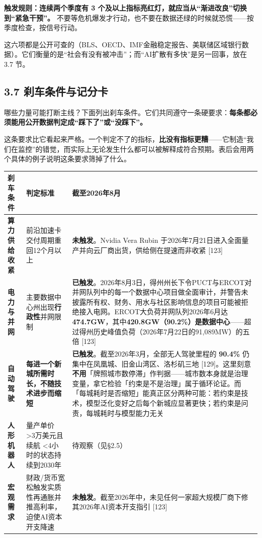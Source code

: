 \documentclass[11pt,a4paper]{ctexart}
\begin{document}
\textbf{触发规则：连续两个季度有 3 个及以上指标亮红灯，就应当从“渐进改良”切换到“紧急干预”。} 不要等危机爆发才行动，也不要在数据还绿的时候就恐慌——按季度检查，按信号行动。

这六项都是公开可查的（BLS、OECD、IMF金融稳定报告、美联储区域银行数据）。它们衡量的是“社会有没有被冲击”；而“AI扩散有多快”是另一回事，放在 3.7 节。

\subsection{3.7 刹车条件与记分卡}

哪些力量可能打断主线？下面列出刹车条件。它们共同遵守一条硬要求：\textbf{每条都必须能用公开数据判定成“踩下了”或“没踩下”。}

这条要求比它看起来严格。一个判定不了的指标，\textbf{比没有指标更糟}——它制造“我们在监控”的错觉，而实际上无论发生什么都可以被解释成符合预期。表后会用两个具体的例子说明这条要求筛掉了什么。

\begin{center}

\begin{tabularx}{\textwidth}{lXX}
\toprule
刹车条件 & 判定标准 & 截至2026年8月 \\
\midrule
\textbf{算力供给收紧} & 前沿加速卡交付周期重回12个月以上 & \textbf{未触发}。Nvidia Vera Rubin 于2026年7月21日进入全面量产并向云厂商出货，供给侧在提速而非收紧 [123] \\
\textbf{电力与并网} & 主要数据中心州出现\textbf{行政性}并网限制 & \textbf{已触发}。2026年8月3日，得州州长下令PUCT与ERCOT对并网队列中的每一个数据中心项目做全面审计，并警告未披露所有权、财务、用水与社区影响信息的项目可能被拒绝接入电网。ERCOT大负荷并网队列2026年6月达\textbf{474.7GW}，其中\textbf{420.8GW（90.2\%）是数据中心}——超过得州历史峰值负荷（2026年7月22日的91,089MW）的五倍 [123] \\
\textbf{自动驾驶} & \textbf{每进一个新城所需时长，不随技术进步而缩短} & \textbf{已触发}。截至2026年3月，全部无人驾驶里程的 \textbf{90.4\%} 仍集中在凤凰城、旧金山湾区、洛杉矶三地 [129]。这里刻意\textbf{不用}「牌照城市数停滞」作判据——城市数本身就是治理变量，拿它检验「约束是不是治理」属于循环论证。而「每城耗时是否缩短」能真正区分两种可能：若约束是技术，模型泛化变好之后每个新城应显著更快；若约束是问责，每城耗时与模型能力无关 \\
\textbf{人形机器人} & 量产单价 >3万美元且续航 <4小时的状态持续到2030年 & 待观察（见\S{}2.5） \\
\textbf{宏观需求} & 财政/货币宽松触发实质性再通胀并推高利率，迫使AI资本开支降速 & \textbf{未触发}。截至2026年中，未见任何一家超大规模厂商下修其2026年AI资本开支指引 [123] \\
\bottomrule
\end{tabularx}
\end{center}
\end{document}
